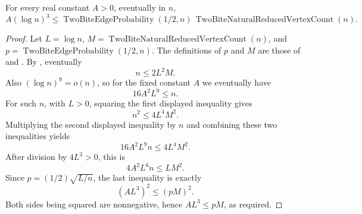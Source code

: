 \begin{lemma}
For every real constant \(A>0\), eventually in \(n\),
\[
A(\log n)^3
  \leq
  \operatorname{TwoBiteEdgeProbability}(1/2,n)\,
  \operatorname{TwoBiteNaturalReducedVertexCount}(n).
\]
\end{lemma}
\begin{proof}
Let \(L=\log n\), \(M=\operatorname{TwoBiteNaturalReducedVertexCount}(n)\), and
\(p=\operatorname{TwoBiteEdgeProbability}(1/2,n)\).  The definitions of
\(p\) and \(M\) are those of  and
.  By
, eventually
\[
n \leq 2L^2M .
\]
Also \((\log n)^9=o(n)\), so for the fixed constant \(A\) we eventually have
\[
16A^2L^9 \leq n .
\]
For such \(n\), with \(L>0\), squaring the first displayed inequality gives
\[
n^2\leq 4L^4M^2 .
\]
Multiplying the second displayed inequality by \(n\) and combining these two
inequalities yields
\[
16A^2L^9n \leq 4L^4M^2.
\]
After division by \(4L^3>0\), this is
\[
4A^2L^6 n \leq L M^2 .
\]
Since \(p=(1/2)\sqrt{L/n}\), the last inequality is exactly
\[
(A L^3)^2 \leq (pM)^2 .
\]
Both sides being squared are nonnegative, hence \(A L^3\leq pM\), as required.
\end{proof}
